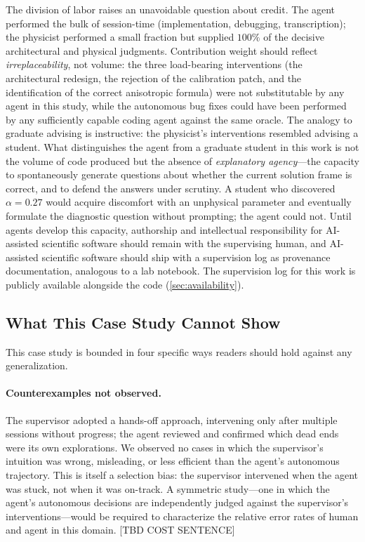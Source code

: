 \documentclass{article}
\begin{document}
The division of labor raises an unavoidable question about credit. The agent performed the bulk of session-time (implementation, debugging, transcription); the physicist performed a small fraction but supplied $100\%$ of the decisive architectural and physical judgments. Contribution weight should reflect \emph{irreplaceability}, not volume: the three load-bearing interventions (the architectural redesign, the rejection of the calibration patch, and the identification of the correct anisotropic formula) were not substitutable by any agent in this study, while the autonomous bug fixes could have been performed by any sufficiently capable coding agent against the same oracle. The analogy to graduate advising is instructive: the physicist's interventions resembled advising a student. What distinguishes the agent from a graduate student in this work is not the volume of code produced but the absence of \emph{explanatory agency}---the capacity to spontaneously generate questions about whether the current solution frame is correct, and to defend the answers under scrutiny. A student who discovered $\alpha = 0.27$ would acquire discomfort with an unphysical parameter and eventually formulate the diagnostic question without prompting; the agent could not. Until agents develop this capacity, authorship and intellectual responsibility for AI-assisted scientific software should remain with the supervising human, and AI-assisted scientific software should ship with a supervision log as provenance documentation, analogous to a lab notebook. The supervision log for this work is publicly available alongside the code (\cref{sec:availability}).

\subsection{What This Case Study Cannot Show}
\label{sec:cannot}

This case study is bounded in four specific ways readers should hold against any generalization.

\paragraph{Counterexamples not observed.}
The supervisor adopted a hands-off approach, intervening only after multiple sessions without progress; the agent reviewed and confirmed which dead ends were its own explorations. We observed no cases in which the supervisor's intuition was wrong, misleading, or less efficient than the agent's autonomous trajectory. This is itself a selection bias: the supervisor intervened when the agent was stuck, not when it was on-track. A symmetric study---one in which the agent's autonomous decisions are independently judged against the supervisor's interventions---would be required to characterize the relative error rates of human and agent in this domain. [TBD COST SENTENCE]
\end{document}
